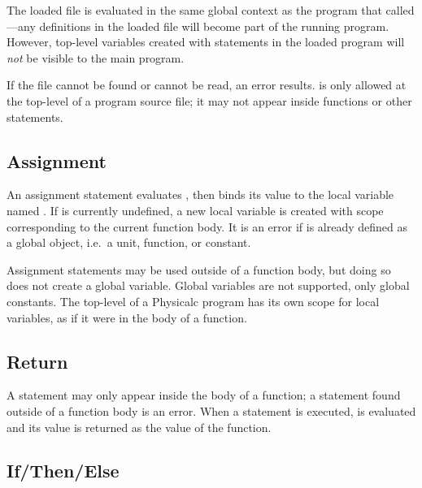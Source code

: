 The loaded file is evaluated in the same global context as the program
that called ---any definitions in the loaded file will
become part of the running program.  However, top-level variables
created with  statements in the loaded program will
\emph{not} be visible to the main program.

If the file cannot be found or cannot be read, an error results.
 is only allowed at the top-level of a program source file;
it may not appear inside functions or other statements.


\subsection{Assignment}

\begin{syntax}
 \id{} \key{=} \expr{}
\end{syntax}

An assignment statement evaluates \expr{}, then binds its value to the
local variable named \id{}.  If \id{} is currently undefined, a new
local variable is created with scope corresponding to the current
function body.  It is an error if \id{} is already defined as a global
object, i.e.\ a unit, function, or constant.

Assignment statements may be used outside of a function body, but
doing so does not create a global variable.  Global variables are not
supported, only global constants.  The top-level of a Physicalc
program has its own scope for local variables, as if it were in the
body of a function.


\subsection{Return}
\label{return-stmt}

\begin{syntax}
 \expr{}
\end{syntax}

A  statement may only appear inside the body of a
function; a  statement found outside of a function body is
an error.  When a  statement is executed, \expr{} is
evaluated and its value is returned as the value of the function.



\subsection{If/Then/Else}


